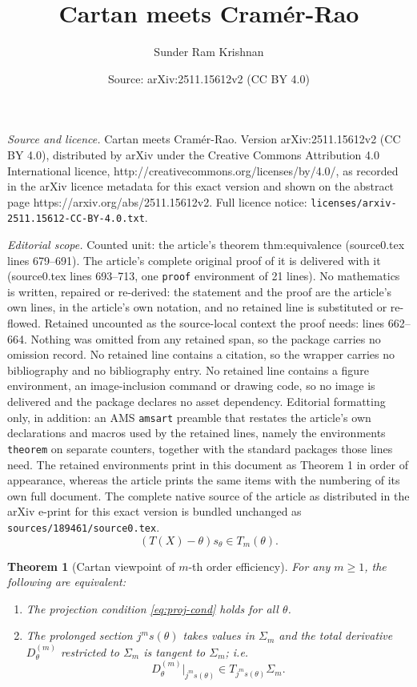 \documentclass[10pt,a4paper]{amsart}
\title{Cartan meets Cramér-Rao}
\author{Sunder Ram Krishnan}
\date{Source: arXiv:2511.15612v2 (CC BY 4.0)}
\newtheorem{theorem}{Theorem}
\begin{document}
\maketitle

\noindent\emph{Source and licence.} Cartan meets Cramér-Rao. Version arXiv:2511.15612v2 (CC BY 4.0), distributed by arXiv under the Creative Commons Attribution 4.0 International licence, http://creativecommons.org/licenses/by/4.0/, as recorded in the arXiv licence metadata for this exact version and shown on the abstract page https://arxiv.org/abs/2511.15612v2. Full licence notice: \texttt{licenses/arxiv-2511.15612-CC-BY-4.0.txt}.\par\smallskip

\noindent\textit{Editorial scope.} Counted unit: the article's theorem thm:equivalence (source0.tex lines 679--691). The article's complete original proof of it is delivered with it (source0.tex lines 693--713, one \texttt{proof} environment of 21 lines). No mathematics is written, repaired or re-derived: the statement and the proof are the article's own lines, in the article's own notation, and no retained line is substituted or re-flowed.  Retained uncounted as the source-local context the proof needs: lines 662--664.  Nothing was omitted from any retained span, so the package carries no omission record.  No retained line contains a citation, so the wrapper carries no bibliography and no bibliography entry.  No retained line contains a figure environment, an image-inclusion command or drawing code, so no image is delivered and the package declares no asset dependency.  Editorial formatting only, in addition: an AMS \texttt{amsart} preamble that restates the article's own declarations and macros used by the retained lines, namely the environments \texttt{theorem} on separate counters, together with the standard packages those lines need.  The retained environments print in this document as Theorem 1 in order of appearance, whereas the article prints the same items with the numbering of its own full document.  The complete native source of the article as distributed in the arXiv e-print for this exact version is bundled unchanged as \texttt{sources/189461/source0.tex}.
\begin{equation}\label{eq:proj-cond}
(T(X)-\theta)s_\theta \in T_m(\theta).
\end{equation}

\begin{theorem}[Cartan viewpoint of $m$-th order efficiency]
\label{thm:equivalence}
For any $m\ge1$, the following are equivalent:
\begin{enumerate}
\item The projection condition \eqref{eq:proj-cond} holds for all $\theta$.
\item The prolonged section $j^m s(\theta)$ takes values in $\Sigma_m$ and
the total derivative $D_\theta^{(m)}$ restricted to $\Sigma_m$ is tangent to
$\Sigma_m$; i.e.
\[
D_\theta^{(m)}\big|_{j^ms(\theta)}\in T_{j^m s(\theta)}\Sigma_m.
\]
\end{enumerate}
\end{theorem}
\end{document}
